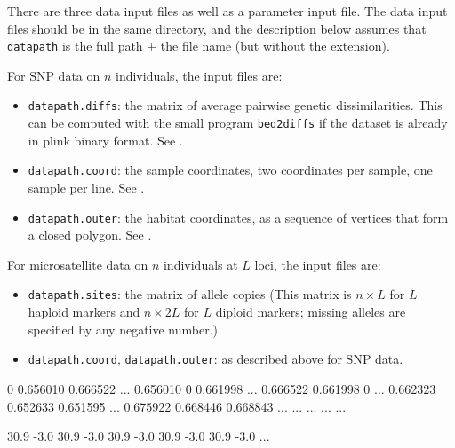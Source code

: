 \documentclass[a4paper,10pt,DIV=15,titlepage,mpinclude=true]{scrartcl}
\newcommand{\keystring}[1]{{\tt #1}}
\begin{document}
There are three data input files as well as a parameter input file. The data input files should be in the same directory, and the description below assumes that \keystring{datapath} is the full path + the file name (but without the extension).

For SNP data on $n$ individuals, the input files are:
\begin{itemize}
  \item \keystring{datapath.diffs}: the matrix of average pairwise genetic dissimilarities. This can be computed with the small program \keystring{bed2diffs} if the dataset is already in plink binary format. See .
  \item \keystring{datapath.coord}: the sample coordinates, two coordinates per sample, one sample per line. See .
  \item \keystring{datapath.outer}: the habitat coordinates, as a sequence of vertices that form a closed polygon. See .
\end{itemize}

For microsatellite data on $n$ individuals at $L$ loci, the input files are:
\begin{itemize}
  \item \keystring{datapath.sites}: the matrix of allele copies (This matrix is $n\times L $ for $L$ haploid markers and $n\times2L$ for $L$ diploid markers; missing alleles are specified by any negative number.)
  \item \keystring{datapath.coord}, \keystring{datapath.outer}: as described above for SNP data.
\end{itemize}


\begin{myverbbox}{\WangetalIrregularHabitatDiffs}
       0  0.656010  0.666522   ...
0.656010         0  0.661998   ...
0.666522  0.661998         0   ...
0.662323  0.652633  0.651595   ...
0.675922  0.668446  0.668843   ...
     ...       ...       ...   ...
     
     
\end{myverbbox}

\begin{myverbbox}{\WangetalIrregularHabitatCoord}
30.9  -3.0
30.9  -3.0
30.9  -3.0
30.9  -3.0
30.9  -3.0
...


\end{myverbbox}
\end{document}
